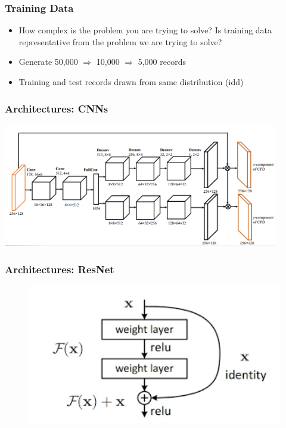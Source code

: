 \documentclass{beamer}
\begin{document}
\begin{frame}
\frametitle{Training Data}
\begin{itemize}
\item How complex is the problem you are trying to solve? 
\bigskip
Is training data representative from the problem we are trying to solve?
\bigskip
\item Generate 50,000 $\Longrightarrow$ 10,000 $\Longrightarrow$ 5,000 records
\bigskip
\item Training and test records drawn from same distribution (idd)
\end{itemize}
\end{frame}

\begin{frame}
\frametitle{Architectures: CNNs ~\parencite{guo2016convolutional}}
\includegraphics[width=12cm,trim = 0cm 0.2cm 0cm 0cm, clip]{img/guo_convNets.png}
\end{frame}

\begin{frame}
\frametitle{Architectures: ResNet  ~\parencite{he2016deep}}
\begin{figure}[h]
\includegraphics[width=12cm,trim = 0cm 0.0cm 0cm 0cm, clip]{img/resnet_idea.png}
\end{figure}
\end{frame}
\end{document}
